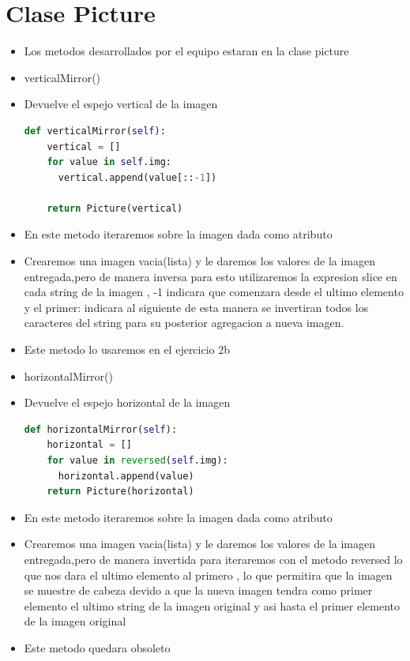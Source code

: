 \documentclass{article}
\begin{document}
	\section{Clase Picture }
	\begin{itemize}		
		\item Los metodos desarrollados por el equipo estaran en la clase picture 
		\item verticalMirror()
		\item Devuelve el espejo vertical de la imagen
		\begin{lstlisting}[language=Python, caption={VerticalMirror}, float=H]
			def verticalMirror(self):
    vertical = []
    for value in self.img:
      vertical.append(value[::-1])

    return Picture(vertical)
        \end{lstlisting}
		\item En este metodo iteraremos sobre la imagen dada como atributo 
		\item Crearemos una imagen vacia(lista) y le daremos los valores de la imagen entregada,pero de manera inversa 
		      para esto utilizaremos  la expresion slice en cada string de la imagen , -1 indicara que comenzara desde el ultimo elemento y el primer: indicara al siguiente 
			  de esta manera se invertiran todos los caracteres del string para su posterior agregacion a nueva imagen.
		\item Este metodo lo usaremos en el ejercicio 2b
		
		\item horizontalMirror()
		\item Devuelve el espejo horizontal de la imagen
		\begin{lstlisting}[language=Python, caption={horizontalMirror}, float=H]
			def horizontalMirror(self):
    horizontal = []
    for value in reversed(self.img):
      horizontal.append(value)
    return Picture(horizontal)
        \end{lstlisting}
		\item En este metodo iteraremos sobre la imagen dada como atributo 
		\item Crearemos una imagen vacia(lista) y le daremos los valores de la imagen entregada,pero de manera invertida  
		      para iteraremos con el metodo reversed lo que nos dara el ultimo elemento al primero , lo que permitira que la imagen se muestre de cabeza
			   devido a que la nueva imagen tendra como primer elemento el ultimo string de la imagen original y asi hasta el primer elemento de la imagen original 
		\item Este metodo quedara obsoleto 


\end{itemize}
\end{document}
